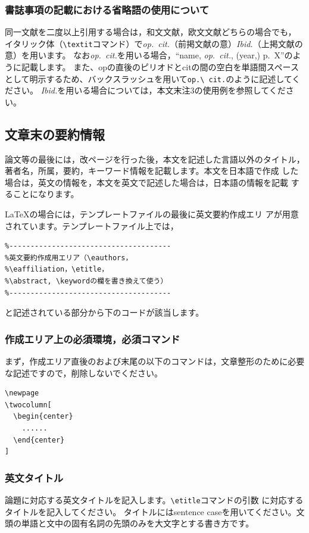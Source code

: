 \documentclass[b5paper,10pt,twocolumn,tombow]{jarticle}
\begin{document}
\subsubsection{書誌事項の記載における省略語の使用について}

同一文献を二度以上引用する場合は，和文文献，欧文文献どちらの場合でも，
イタリック体（\verb|\textit|コマンド）で\textit{op.\ cit.}（前掲文献の意）\textit{Ibid.}（上掲文献の意）を用います。
なお\textit{op.\ cit.}を用いる場合，``name, \textit{op.\ cit.}, (year,) p.~X''のように記載します。
また、opの直後のピリオドとcitの間の空白を単語間スペースとして明示するため、バックスラッシュを用いて\verb|op.\ cit.|のように記述してください。
\textit{Ibid.}を用いる場合については，本文末注3の使用例を参照してください。


\subsection{文章末の要約情報}
論文等の最後には，改ページを行った後，本文を記述した言語以外のタイトル，
著者名，所属，要約，キーワード情報を記載します。本文を日本語で作成
した場合は，英文の情報を，本文を英文で記述した場合は，日本語の情報を記載
することになります。

\LaTeX{}の場合には，テンプレートファイルの最後に英文要約作成エリ
アが用意されています。テンプレートファイル上では，

\small
\begin{verbatim}
%--------------------------------------
%英文要約作成用エリア（\eauthors，
%\eaffiliation，\etitle，
%\abstract, \keywordの欄を書き換えて使う）
%--------------------------------------
\end{verbatim}
\normalsize

と記述されている部分から下のコードが該当します。

\subsubsection{作成エリア上の必須環境，必須コマンド}
まず，作成エリア直後のおよび末尾の以下のコマンドは，文章整形のために必要
な記述ですので，削除しないでください。
\begin{verbatim}
\newpage
\twocolumn[
  \begin{center}
    ......
  \end{center}
]
\end{verbatim}


\subsubsection{英文タイトル}
論題に対応する英文タイトルを記入します。\verb|\etitle|コマンドの引数
に対応するタイトルを記入してください。
タイトルにはsentence caseを用いてください。文頭の単語と文中の固有名詞の先頭のみを大文字とする書き方です。
\end{document}
